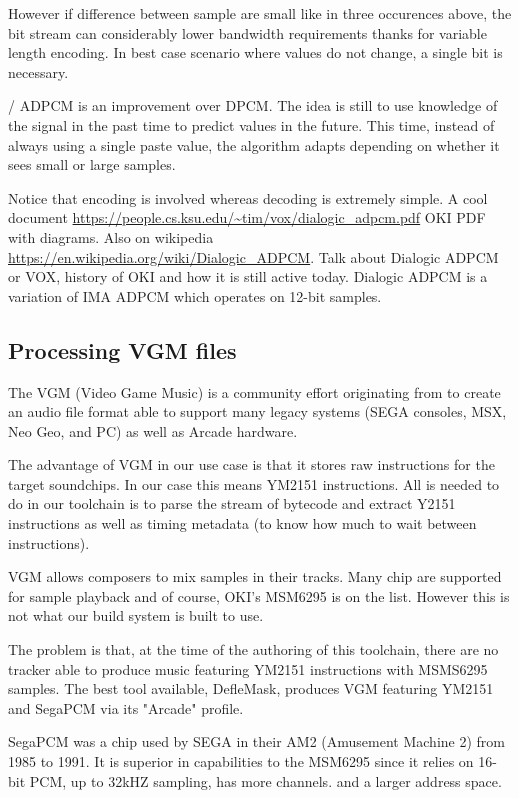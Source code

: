 However if difference between sample are small like in three occurences above, the bit stream can considerably lower bandwidth requirements thanks for variable length encoding. In best case scenario where values do not change, a single bit is necessary.

/
ADPCM is an improvement over DPCM. The idea is still to use knowledge of the signal in the past time to predict values in the future. This time, instead of always using a single paste value, the algorithm adapts depending on whether it sees small or large samples.



Notice that encoding is involved whereas decoding is extremely simple. A cool document \url{https://people.cs.ksu.edu/~tim/vox/dialogic_adpcm.pdf} OKI PDF with diagrams. Also on wikipedia \url{https://en.wikipedia.org/wiki/Dialogic_ADPCM}. Talk about Dialogic ADPCM or VOX, history of OKI and how it is still active today. Dialogic ADPCM is a variation of IMA ADPCM which operates on 12-bit samples.


\subsection{Processing VGM files}
The VGM (Video Game Music) is a community effort originating from  to create an audio file format able to support many legacy systems (SEGA consoles, MSX, Neo Geo, and PC) as well as Arcade hardware.

The advantage of VGM in our use case is that it stores raw instructions for the target soundchips. In our case this means YM2151 instructions. All is needed to do in our toolchain is to parse the stream of bytecode and extract Y2151 instructions as well as timing metadata (to know how much to wait between instructions).

VGM allows composers to mix samples in their tracks. Many chip are supported for sample playback and of course, OKI's MSM6295 is on the list. However this is not what our build system is built to use.

The problem is that, at the time of the authoring of this toolchain, there are no tracker able to produce music featuring YM2151 instructions with MSMS6295 samples. The best tool available, DefleMask, produces VGM featuring YM2151 and SegaPCM via its "Arcade" profile.

SegaPCM was a chip used by SEGA in their AM2 (Amusement Machine 2) from 1985 to 1991. It is superior in capabilities to the MSM6295 since it relies on 16-bit PCM, up to 32kHZ sampling, has more channels. and a larger address space.


